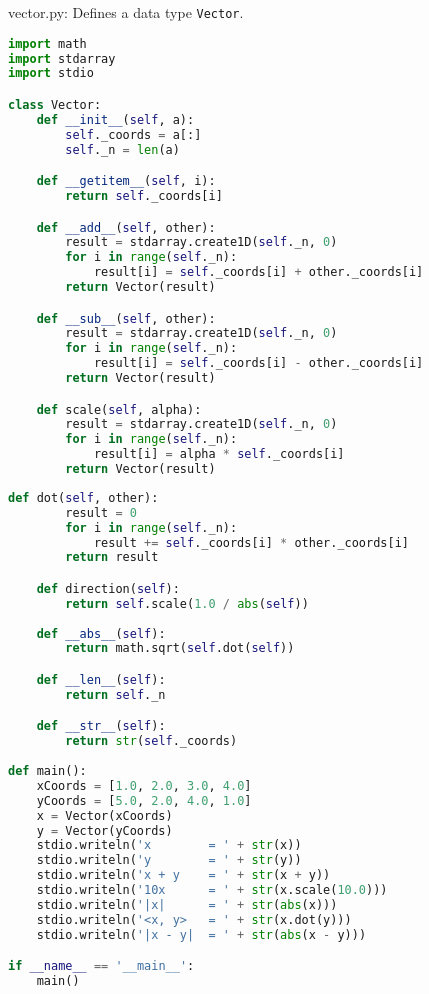 \documentclass[8pt,a4paper,compress,handout]{beamer}
\begin{document}
\begin{frame}[fragile]
\begin{framed}
\tiny vector.py: Defines a data type \lstinline{Vector}.
\end{framed}

\begin{lstlisting}[language=Python]
import math
import stdarray
import stdio

class Vector:
    def __init__(self, a):
        self._coords = a[:]
        self._n = len(a)

    def __getitem__(self, i):
        return self._coords[i]

    def __add__(self, other):
        result = stdarray.create1D(self._n, 0)
        for i in range(self._n):
            result[i] = self._coords[i] + other._coords[i]
        return Vector(result)

    def __sub__(self, other):
        result = stdarray.create1D(self._n, 0)
        for i in range(self._n):
            result[i] = self._coords[i] - other._coords[i]
        return Vector(result)

    def scale(self, alpha):
        result = stdarray.create1D(self._n, 0)
        for i in range(self._n):
            result[i] = alpha * self._coords[i]
        return Vector(result)
\end{lstlisting}
\end{frame}

\begin{frame}[fragile]
\begin{lstlisting}[language=Python]
    def dot(self, other):
        result = 0
        for i in range(self._n):
            result += self._coords[i] * other._coords[i]
        return result

    def direction(self):
        return self.scale(1.0 / abs(self))
     
    def __abs__(self):
        return math.sqrt(self.dot(self))

    def __len__(self):
        return self._n

    def __str__(self):
        return str(self._coords)
        
def main():
    xCoords = [1.0, 2.0, 3.0, 4.0]
    yCoords = [5.0, 2.0, 4.0, 1.0]
    x = Vector(xCoords)
    y = Vector(yCoords)
    stdio.writeln('x        = ' + str(x))
    stdio.writeln('y        = ' + str(y))
    stdio.writeln('x + y    = ' + str(x + y))
    stdio.writeln('10x      = ' + str(x.scale(10.0)))
    stdio.writeln('|x|      = ' + str(abs(x)))
    stdio.writeln('<x, y>   = ' + str(x.dot(y)))
    stdio.writeln('|x - y|  = ' + str(abs(x - y)))

if __name__ == '__main__':
    main()
\end{lstlisting}
\end{frame}
\end{document}
